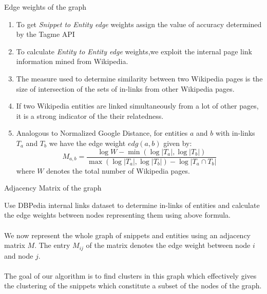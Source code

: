 \documentclass{beamer}
\begin{document}
\begin{frame}{Edge weights of the graph}
\begin{enumerate}
  \item To get {\it Snippet to Entity edge} weights assign the value
    of accuracy determined by the Tagme API
  \item To calculate {\it Entity to Entity edge} weights,we
    exploit the internal page link information mined from
    Wikipedia. 
  \item The measure used to determine similarity between two
    Wikipedia pages is the size of intersection of the
    sets of in-links from other Wikipedia pages. 
  \item If two Wikipedia entities are linked simultaneously from a lot
    of other pages, it is a strong indicator of the their relatedness.
  \item Analogous to Normalized Google Distance, for entities $a$ and
    $b$ with in-links $T_a$ and $T_b$ we have the edge
    weight $edg(a,b)$ given by:
$$ 
M_{a,b} = \frac{\log W - \min(\log |T_a|, \log |T_b|)}{\max(\log
  |T_a|,\log |T_b|) - \log |T_a \cap T_b|}
$$
where $W$ denotes the total number of Wikipedia pages. 

\end{enumerate}
\end{frame}

\begin{frame}{Adjacency Matrix of the graph}

Use DBPedia internal links dataset to determine in-links of
entities and calculate the edge weights between nodes representing
them using above formula. \\~\\

We now represent the whole graph of snippets and entities using an
adjacency matrix $M$. The entry $M_{ij}$ of the matrix denotes the
edge weight between node $i$ and node $j$.  \\~\\

The goal of our algorithm is to find clusters in this graph which
effectively gives the clustering of the snippets which constitute a
subset of the nodes of the graph.

\end{frame}
\end{document}
